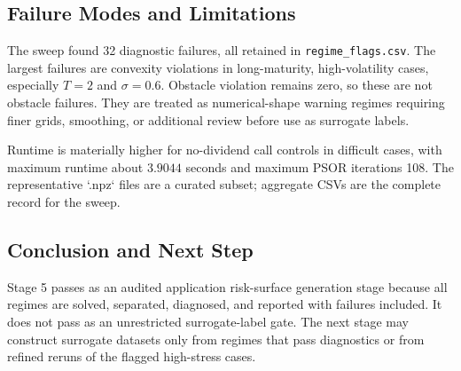 \documentclass[11pt]{article}
\begin{document}


\subsection{Failure Modes and Limitations}
The sweep found 32 diagnostic failures, all retained in \texttt{regime\_flags.csv}. The largest failures are convexity violations in long-maturity, high-volatility cases, especially $T=2$ and $\sigma=0.6$. Obstacle violation remains zero, so these are not obstacle failures. They are treated as numerical-shape warning regimes requiring finer grids, smoothing, or additional review before use as surrogate labels.

Runtime is materially higher for no-dividend call controls in difficult cases, with maximum runtime about $3.9044$ seconds and maximum PSOR iterations 108. The representative `.npz` files are a curated subset; aggregate CSVs are the complete record for the sweep.

\subsection{Conclusion and Next Step}
Stage 5 passes as an audited application risk-surface generation stage because all regimes are solved, separated, diagnosed, and reported with failures included. It does not pass as an unrestricted surrogate-label gate. The next stage may construct surrogate datasets only from regimes that pass diagnostics or from refined reruns of the flagged high-stress cases.
\end{document}
